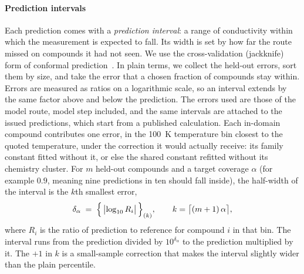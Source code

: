 \paragraph{Prediction intervals} Each prediction comes with a \emph{prediction interval}: a range
of conductivity within which the measurement is expected to fall. Its width is set by how far the
route missed on compounds it had not seen. We use the cross-validation (jackknife) form of conformal
prediction~\cite{lei2018distributi}. In plain terms, we collect the held-out errors, sort them by
size, and take the error that a chosen fraction of compounds stay within. Errors are measured as
ratios on a logarithmic scale, so an interval extends by the same factor above and below the
prediction. The errors used are those of the model route, model step included, and the same intervals
are attached to
the issued predictions, which start from a published calculation. Each in-domain compound
contributes one error, in the \SI{100}{\kelvin} temperature bin closest to the quoted temperature,
under the correction it would actually receive: its family constant fitted without it, or else the
shared constant refitted without its chemistry cluster. For $m$ held-out compounds and a target
coverage $\alpha$ (for example $0.9$, meaning nine predictions in ten should fall inside), the
half-width of the interval is the $k$th smallest error,
%
\begin{equation}
  \delta_\alpha \;=\; \Bigl\{\, \bigl|\log_{10} R_i \bigr| \,\Bigr\}_{(k)},
  \qquad k = \bigl\lceil (m+1)\,\alpha \bigr\rceil,
  \label{eq:conformal}
\end{equation}
%
where $R_i$ is the ratio of prediction to reference for compound $i$ in that bin. The interval runs
from the prediction divided by $10^{\delta_\alpha}$ to the prediction multiplied by it. The $+1$ in
$k$ is a small-sample correction that makes the interval slightly wider than the plain percentile.

